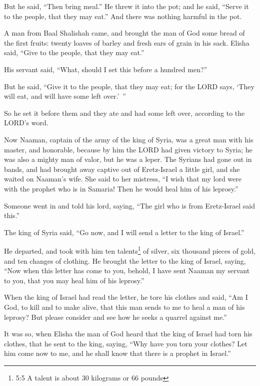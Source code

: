 \myverse{}But he said, “Then bring meal.” He threw it into the pot; and
he said, “Serve it to the people, that they may eat.” And there was nothing harmful in the pot.

\myverse{}A man from Baal Shalishah came, and brought the man of God some
bread of the first fruits: twenty loaves of barley and fresh ears of grain in his sack. Elisha said, “Give
to the people, that they may eat.”

\myverse{}His servant said, “What, should I set this before a hundred men?”

But he said, “Give it to the people, that they may eat; for the LORD says, ‘They will eat,
and will have some left over.’ ”

\myverse{}So he set it before them and they ate and had some left over,
according to the LORD’s word.


\mychapter{} \myverse*{}Now Naaman, captain of the army of the king of Syria, was a great
man with his master, and honorable, because by him the LORD had given victory to Syria; he was also a
mighty man of valor, but he was a leper.
\myverse{}The Syrians had gone out in bands, and had brought away captive out of Eretz-Israel
a little girl, and she waited on Naaman’s wife.
\myverse{}She said to her mistress, “I wish that my lord were with the prophet who is
in Samaria! Then he would heal him of his leprosy.”

\myverse{}Someone went in and told his lord, saying, “The girl who is from
Eretz-Israel said this.”

\myverse{}The king of Syria said, “Go now, and I will send a letter to the
king of Israel.”

He departed, and took with him ten talents\footnote{5:5 A talent is about 30 kilograms or 66 pounds} of silver, six thousand pieces of gold,
and ten changes of clothing.
\myverse{}He brought the letter to the king of Israel, saying, “Now when this letter has
come to you, behold, I have sent Naaman my servant to you, that you may heal him of his leprosy.”

\myverse{}When the king of Israel had read the letter, he tore his clothes
and said, “Am I God, to kill and to make alive, that this man sends to me to heal a man of his leprosy?
But please consider and see how he seeks a quarrel against me.”

\myverse{}It was so, when Elisha the man of God heard that the king of Israel
had torn his clothes, that he sent to the king, saying, “Why have you torn your clothes? Let him come
now to me, and he shall know that there is a prophet in Israel.”

